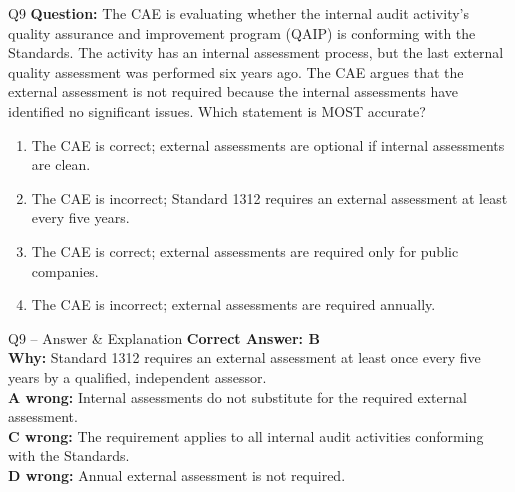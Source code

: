 \documentclass[aspectratio=169,10pt]{beamer}
\begin{document}
	\begin{frame}[t]{Q9}
		\small
		\textbf{Question:} The CAE is evaluating whether the internal audit activity's quality assurance and improvement program (QAIP) is conforming with the Standards. The activity has an internal assessment process, but the last external quality assessment was performed six years ago. The CAE argues that the external assessment is not required because the internal assessments have identified no significant issues. Which statement is MOST accurate?
		\begin{enumerate}[label=\Alph*.,itemsep=1pt,topsep=2pt]
			\item The CAE is correct; external assessments are optional if internal assessments are clean.
			\item The CAE is incorrect; Standard 1312 requires an external assessment at least every five years.
			\item The CAE is correct; external assessments are required only for public companies.
			\item The CAE is incorrect; external assessments are required annually.
		\end{enumerate}
	\end{frame}
	
	\begin{frame}[t]{Q9 -- Answer \& Explanation}
		\small
		\textbf{Correct Answer: B} \\[4pt]
		\textbf{Why:} Standard 1312 requires an external assessment at least once every five years by a qualified, independent assessor. \\[4pt]
		\textbf{A wrong:} Internal assessments do not substitute for the required external assessment. \\[2pt]
		\textbf{C wrong:} The requirement applies to all internal audit activities conforming with the Standards. \\[2pt]
		\textbf{D wrong:} Annual external assessment is not required.
	\end{frame}
	
\end{document}

